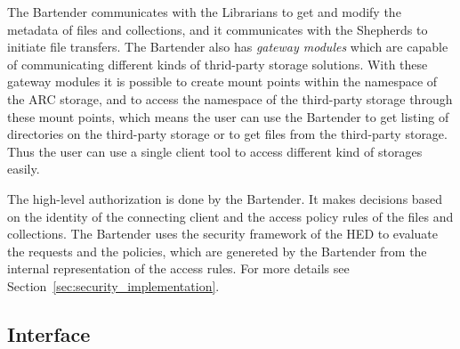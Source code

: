 \documentclass{book}
\begin{document}
The Bartender communicates with the Librarians to get and modify the metadata of files and collections, and it communicates with the Shepherds to initiate file transfers. The Bartender also has \emph{gateway modules} which are capable of communicating different kinds of thrid-party storage solutions. With these gateway modules it is possible to create mount points within the namespace of the ARC storage, and to access the namespace of the third-party storage through these mount points, which means the user can use the Bartender to get listing of directories on the third-party storage or to get files from the third-party storage. Thus the user can use a single client tool to access different kind of storages easily.

The high-level authorization is done by the Bartender. It makes decisions based on the identity of the connecting client and the access policy rules of the files and collections. The Bartender uses the security framework of the HED to evaluate the requests and the policies, which are genereted by the Bartender from the internal representation of the access rules. For more details see Section~\ref{sec:security_implementation}.


\subsection{Interface} %
\end{document}
